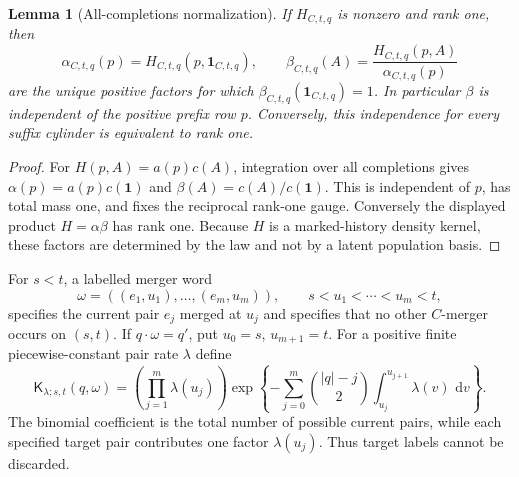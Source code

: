 \documentclass[11pt]{article}
\newtheorem{lemma}[theorem]{Lemma}
\newcommand{\dd}{\,\mathrm d}
\newcommand{\one}{\mathbf 1}
\begin{document}
\begin{lemma}[All-completions normalization]
\label{lem:supp-canonical-continuation}
If $H_{C,t,q}$ is nonzero and rank one, then
\[
\alpha_{C,t,q}(p)=H_{C,t,q}(p,\one_{C,t,q}),
\qquad
\beta_{C,t,q}(A)=
\frac{H_{C,t,q}(p,A)}{\alpha_{C,t,q}(p)}
\]
are the unique positive factors for which $\beta_{C,t,q}(\one_{C,t,q})=1$.  In particular $\beta$ is independent of the positive prefix row $p$.  Conversely, this independence for every suffix cylinder is equivalent to rank one.
\end{lemma}

\begin{proof}
For $H(p,A)=a(p)c(A)$, integration over all completions gives $\alpha(p)=a(p)c(\one)$ and $\beta(A)=c(A)/c(\one)$.  This is independent of $p$, has total mass one, and fixes the reciprocal rank-one gauge.  Conversely the displayed product $H=\alpha\beta$ has rank one.  Because $H$ is a marked-history density kernel, these factors are determined by the law and not by a latent population basis.
\end{proof}

For $s<t$, a labelled merger word
\[
\omega=((e_1,u_1),\ldots,(e_m,u_m)),
\qquad s<u_1<\cdots<u_m<t,
\]
specifies the current pair $e_j$ merged at $u_j$ and specifies that no other $C$-merger occurs on $(s,t)$.  If $q\mathbin{\cdot}\omega=q'$, put $u_0=s$, $u_{m+1}=t$.  For a positive finite piecewise-constant pair rate $\lambda$ define
\begin{equation}
\mathsf K_{\lambda;s,t}(q,\omega)=
\left(\prod_{j=1}^m\lambda(u_j)\right)
\exp\!\left\{-\sum_{j=0}^{m}\binom{|q|-j}{2}
\int_{u_j}^{u_{j+1}}\lambda(v)\,\dd v\right\}.
\label{eq:supp-kingman-word}
\end{equation}
The binomial coefficient is the total number of possible current pairs, while each specified target pair contributes one factor $\lambda(u_j)$.  Thus target labels cannot be discarded.
\end{document}

